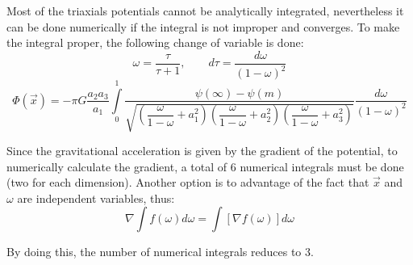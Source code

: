 	Most of the triaxials potentials cannot be analytically integrated, nevertheless it can be done numerically if the integral is not improper and converges. To make the integral proper, the following change of variable is done:
	\begin{equation}
		\omega = \dfrac{\tau}{\tau + 1}, \qquad d\tau = \dfrac{d\omega}{(1 - \omega)^2}
	\end{equation} 
	\begin{equation}
		\Phi(\vec{x}) = -\pi G \dfrac{a_2a_3}{a_1}\int\limits_{0}^{1}\dfrac{\psi(\infty) - \psi(m)}{\sqrt{\left(\dfrac{\omega}{1 - \omega} + a_1^2\right)\left(\dfrac{\omega}{1 - \omega} + a_2^2\right)\left(\dfrac{\omega}{1 - \omega} + a_3^2\right)}}\dfrac{d\omega}{(1 - \omega)^2}
	\end{equation}
	
	Since the gravitational acceleration is given by the gradient of the potential, to numerically calculate the gradient, a total of 6 numerical integrals must be done (two for each dimension). Another option is to advantage of the fact that $\vec{x}$ and $\omega$ are independent variables, thus:
	\begin{equation}
		\nabla \int f(\omega)d\omega = \int [\nabla f(\omega)] d\omega
	\end{equation}
	
	By doing this, the number of numerical integrals reduces to 3.
	
